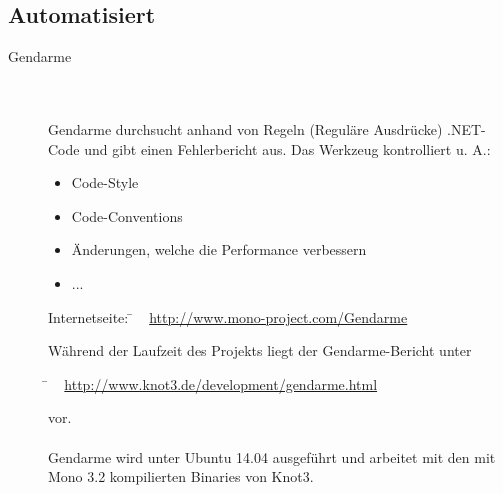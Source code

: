 
\clearpage



\subsection{Automatisiert}
\label{Abschnitt:Programmfehler:Werkzeuge:Automatisiert}



\begin{description}

	\item[Gendarme] \hfill
	\\
	\\
	Gendarme durchsucht anhand von Regeln (Reguläre Ausdrücke) .NET-Code und gibt einen Fehlerbericht aus. Das Werkzeug kontrolliert u. A.:
	\\
	
	\begin{itemize}
	
		\item Code-Style
		\item Code-Conventions
		\item Änderungen, welche die Performance verbessern
		\item ...
	
	\end{itemize}
			
	\begin{tabbing}
		Internetseite:
		\= ~ \href {http://www.mono-project.com/Gendarme}
                   {http://www.mono-project.com/Gendarme}
		\\
	\end{tabbing}
	
	Während der Laufzeit des Projekts liegt der Gendarme-Bericht unter
	\begin{tabbing}
			\= ~ \href {http://www.knot3.de/development/gendarme.html}
     			       {http://www.knot3.de/development/gendarme.html}
     			   
	\end{tabbing} vor.
	~\\~\\
	Gendarme wird unter Ubuntu 14.04 ausgeführt und arbeitet mit den mit Mono 3.2 kompilierten Binaries von Knot3.
	
\end{description}



